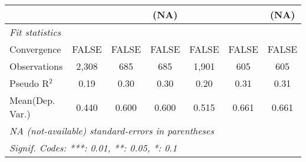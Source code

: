 \begin{tabular}{lcccccc}
                                                                              &                        &                        & (NA)                   &                        &                        & (NA)\\   
   \midrule
   \emph{Fit statistics}\\
   Convergence                                                                &FALSE                   & FALSE                  & FALSE                  & FALSE                  & FALSE                  & FALSE\\  
   Observations                                                               & 2,308                  & 685                    & 685                    & 1,901                  & 605                    & 605\\  
   Pseudo R$^2$                                                               & 0.19                   & 0.30                   & 0.30                   & 0.20                   & 0.31                   & 0.31\\  
Mean(Dep. Var.) & 0.440 & 0.600 & 0.600 & 0.515 & 0.661 & 0.661 \\
   \midrule \midrule
   \multicolumn{7}{l}{\emph{NA (not-available) standard-errors in parentheses}}\\
   \multicolumn{7}{l}{\emph{Signif. Codes: ***: 0.01, **: 0.05, *: 0.1}}\\
\end{tabular}
\par\endgroup
